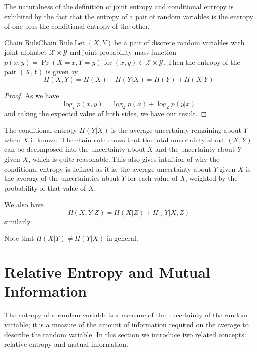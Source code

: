 \documentclass[../main.tex]{subfiles}
\begin{document}
The naturalness of the definition of joint entropy and conditional entropy is exhibited by the fact that the entropy of a pair of random variables is the entropy of one plus the conditional entropy of the other.

\begin{theorem}{Chain Rule}{Chain Rule}
  Let $(X,Y)$ be a pair of discrete random variables with joint alphabet $\mathcal{X} \times \mathcal{Y}$ and joint probability mass function $p(x,y) = \Pr(X=x,Y=y)$ for $(x,y) \in \mathcal{X} \times \mathcal{Y}$. Then the entropy of the pair $(X,Y)$ is given by
  \begin{equation}
    H(X,Y) = H(X) + H(Y|X) = H(Y) + H(X|Y)
  \end{equation}
\end{theorem}
\begin{proof}
  As we have
  \begin{equation*}
    \log_2 p(x,y) = \log_2 p(x) + \log_2 p(y|x)
  \end{equation*}
  and taking the expected value of both sides, we have our result.
\end{proof}

\begin{remark}
  The conditional entropy $H(Y|X)$ is the average uncertainty remaining about $Y$ when $X$ is known. The chain rule shows that the total uncertainty about $(X,Y)$ can be decomposed into the uncertainty about $X$ and the uncertainty about $Y$ given $X$, which is quite reasonable. This also gives intuition of why the conditional entropy is defined as it is: the average uncertainty about $Y$ given $X$ is the average of the uncertainties about $Y$ for each value of $X$, weighted by the probability of that value of $X$.
\end{remark}

We also have
\begin{equation}
  H(X, Y | Z) = H(X | Z) + H(Y | X, Z)
\end{equation}
similarly.

\begin{remark}
  Note that $H(X|Y) \neq H(Y|X)$ in general.
\end{remark}

\section{Relative Entropy and Mutual Information}
The entropy of a random variable is a measure of the uncertainty of the random variable; it is a measure of the amount of information required on the average to describe the random variable. In this section we introduce two related concepts: relative entropy and mutual information. 
\end{document}
